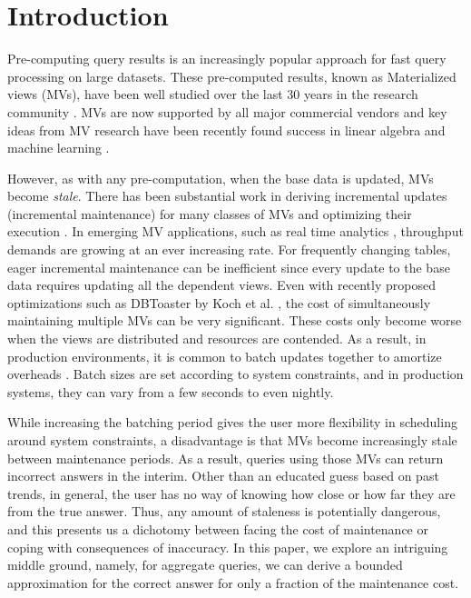 \vspace{-0.5em}
\section{Introduction}
Pre-computing query results is an increasingly popular approach for fast query processing on large datasets.
These pre-computed results, known as Materialized views (MVs), have been well studied over the last 30 years in the
research community \cite{LarsonY85, gupta1995maintenance, chirkova2011materialized}.
MVs are now supported by all major commercial vendors and key ideas from MV research have been recently found success in linear algebra and machine learning \cite{nikolic2014linview, zhang2014mat}.

However, as with any pre-computation, when the base data is updated, MVs become \emph{stale}. 
There has been substantial work in deriving incremental updates (incremental maintenance) for many classes of MVs and optimizing their execution \cite{chirkova2011materialized, DBLP:journals/vldb/KochAKNNLS14}.
In emerging MV applications, such as real time analytics \cite{rainbird}, throughput demands are growing at an ever increasing rate.
For frequently changing tables, eager incremental maintenance can be inefficient since every update to the base data requires updating all the dependent views.
Even with recently proposed optimizations such as DBToaster by Koch et al. \cite{DBLP:journals/vldb/KochAKNNLS14}, the cost of simultaneously maintaining multiple MVs can be very significant.
These costs only become worse when the views are distributed and resources are contended.
As a result, in production environments, it is common to batch updates together to amortize overheads \cite{chirkova2011materialized}.
Batch sizes are set according to system constraints, and in production systems, they can vary from a few seconds to even nightly.  

While increasing the batching period gives the user more flexibility in scheduling around system constraints, a disadvantage is that MVs become increasingly stale between maintenance periods.
As a result, queries using those MVs can return incorrect answers in the interim.
Other than an educated guess based on past trends, in general, the user has no way of knowing how close or how far they are from the true answer.
Thus, any amount of staleness is potentially dangerous, and this presents us a dichotomy between facing the cost of maintenance or coping with consequences of inaccuracy.
In this paper, we explore an intriguing middle ground, namely, for aggregate queries, we can derive a bounded approximation for the correct answer for only a fraction of the maintenance cost. 

